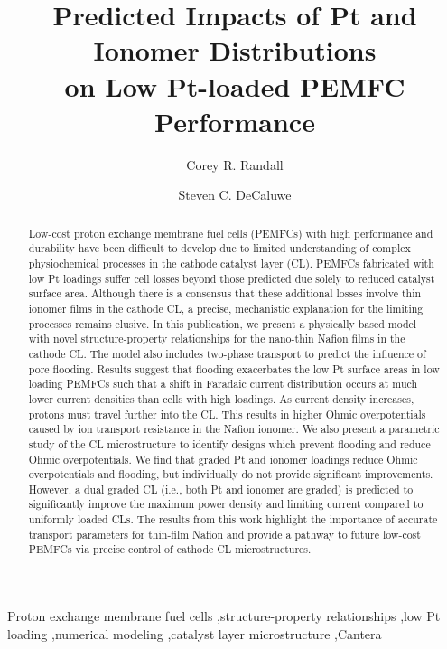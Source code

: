 \documentclass[final,3p,times,twocolumn]{elsarticle}    %
\begin{document}
\begin{frontmatter}

\title{Predicted Impacts of Pt and Ionomer Distributions \\ 
       on Low Pt-loaded PEMFC Performance}

\author[CSM]{Corey R. Randall}
\author[CSM]{Steven C. DeCaluwe }
        
\address[CSM]{Colorado School of Mines, 1500 Illinois St, Golden, CO 80401}

\begin{abstract} 
Low-cost proton exchange membrane fuel cells (PEMFCs) with high performance and durability have been difficult to develop due to limited understanding of complex physiochemical processes in the cathode catalyst layer (CL). PEMFCs fabricated with low Pt loadings suffer cell losses beyond those predicted due solely to reduced catalyst surface area. Although there is a consensus that these additional losses involve thin ionomer films in the cathode CL, a precise, mechanistic explanation for the limiting processes remains elusive. In this publication, we present a physically based model with novel structure-property relationships for the nano-thin Nafion films in the cathode CL. The model also includes two-phase transport to predict the influence of pore flooding. Results suggest that flooding exacerbates the low Pt surface areas in low loading PEMFCs such that a shift in Faradaic current distribution occurs at much lower current densities than cells with high loadings. As current density increases, protons must travel further into the CL. This results in higher Ohmic overpotentials caused by ion transport resistance in the Nafion ionomer. We also present a parametric study of the CL microstructure to identify designs which prevent flooding and reduce Ohmic overpotentials. We find that graded Pt and ionomer loadings reduce Ohmic overpotentials and flooding, but individually do not provide significant improvements. However, a dual graded CL (i.e., both Pt and ionomer are graded) is predicted to significantly improve the maximum power density and limiting current compared to uniformly loaded CLs. The results from this work highlight the importance of accurate transport parameters for thin-film Nafion and provide a pathway to future low-cost PEMFCs via precise control of cathode CL microstructures.
\end{abstract}

\begin{keyword}
Proton exchange membrane fuel cells \sep structure-property relationships \sep low Pt loading \sep numerical modeling \sep catalyst layer microstructure \sep Cantera
\end{keyword}

\end{frontmatter}
\end{document}
